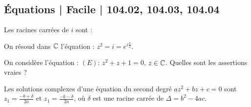 \subsection{Équations | Facile | 104.02, 104.03, 104.04}




\begin{question} 
Les racines carrées de $i$ sont : 
\begin{answers}


\end{answers}
\begin{explanations}
On résoud dans $\mathbb{C}$ l'équation : $z^2=i=e^{i\frac{\pi}{2}}$. 
\end{explanations}

\end{question}


\begin{question} 
On considère l'équation : $(E) : \, z^2+z+1=0$, $z\in \mathbb{C}$.   Quelles sont les assertions vraies ?
\begin{answers}
    


\end{answers}
\begin{explanations}
Les solutions complexes d'une équation du second degré $az^2+bz+c=0$ sont $z_1=\frac{-b+\delta}{2a}$ et  
$z_1=\frac{-b-\delta}{2a}$, où $\delta$ est une racine carrée de $\Delta=b^2-4ac$.
\end{explanations}

\end{question}




